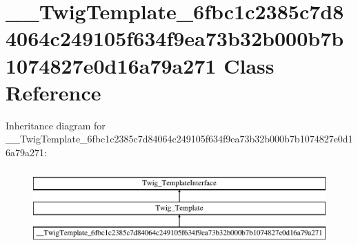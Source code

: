 \hypertarget{class_____twig_template__6fbc1c2385c7d84064c249105f634f9ea73b32b000b7b1074827e0d16a79a271}{}\section{\+\_\+\+\_\+\+Twig\+Template\+\_\+6fbc1c2385c7d84064c249105f634f9ea73b32b000b7b1074827e0d16a79a271 Class Reference}
\label{class_____twig_template__6fbc1c2385c7d84064c249105f634f9ea73b32b000b7b1074827e0d16a79a271}
Inheritance diagram for \+\_\+\+\_\+\+Twig\+Template\+\_\+6fbc1c2385c7d84064c249105f634f9ea73b32b000b7b1074827e0d16a79a271\+:\begin{figure}[H]
\begin{center}
\leavevmode
\includegraphics[height=3.000000cm]{class_____twig_template__6fbc1c2385c7d84064c249105f634f9ea73b32b000b7b1074827e0d16a79a271}
\end{center}
\end{figure}
